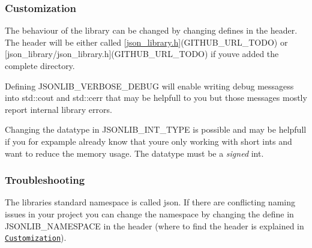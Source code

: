 \subsubsection*{\label{_customization_section}%
Customization}

The behaviour of the library can be changed by changing defines in the header. The header will be either called \mbox{[}\hyperlink{json__library_8h_source}{json\+\_\+library.\+h}\mbox{]}(G\+I\+T\+H\+U\+B\+\_\+\+U\+R\+L\+\_\+\+T\+O\+DO) or \mbox{[}json\+\_\+library/json\+\_\+library.\+h\mbox{]}(G\+I\+T\+H\+U\+B\+\_\+\+U\+R\+L\+\_\+\+T\+O\+DO) if you\textquotesingle{}ve added the complete directory.


\begin{DoxyItemize}
\item Defining {\ttfamily J\+S\+O\+N\+L\+I\+B\+\_\+\+V\+E\+R\+B\+O\+S\+E\+\_\+\+D\+E\+B\+UG} will enable writing debug messagess into {\ttfamily std\+::cout} and {\ttfamily std\+::cerr} that may be helpfull to you but those messages mostly report internal library errors.
\item Changing the datatype in {\ttfamily J\+S\+O\+N\+L\+I\+B\+\_\+\+I\+N\+T\+\_\+\+T\+Y\+PE} is possible and may be helpfull if you for expample already know that youre only working with short ints and want to reduce the memory usage. The datatype must be a {\itshape signed} int.
\end{DoxyItemize}

\subsubsection*{\label{_troubleshooting_section}%
Troubleshooting}


\begin{DoxyItemize}
\item The libraries standard namespace is called {\ttfamily json}. If there are conflicting naming issues in your project you can change the namespace by changing the define in {\ttfamily J\+S\+O\+N\+L\+I\+B\+\_\+\+N\+A\+M\+E\+S\+P\+A\+CE} in the header (where to find the header is explained in \href{#customization_section}{\tt Customization}). 
\end{DoxyItemize}